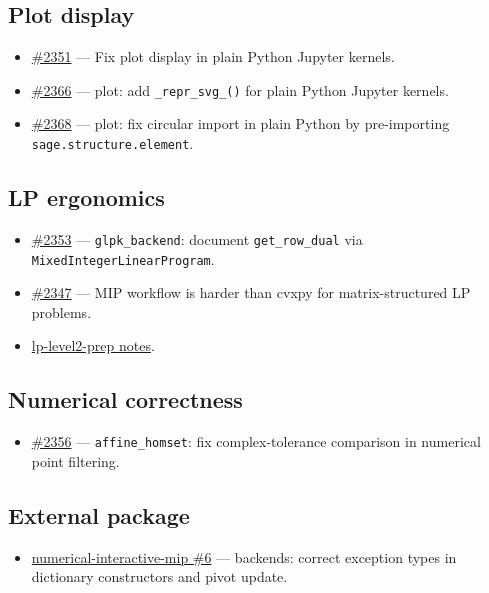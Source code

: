 \documentclass[10pt]{article}
\begin{document}
\subsection*{Plot display}
\begin{itemize}
  \item \href{https://github.com/passagemath/passagemath/pull/2351}{\#2351} --- Fix plot display in plain Python Jupyter kernels.
  \item \href{https://github.com/passagemath/passagemath/pull/2366}{\#2366} --- plot: add \texttt{\_repr\_svg\_()} for plain Python Jupyter kernels.
  \item \href{https://github.com/passagemath/passagemath/pull/2368}{\#2368} --- plot: fix circular import in plain Python by pre-importing \texttt{sage.structure.element}.
\end{itemize}

\subsection*{LP ergonomics}
\begin{itemize}
  \item \href{https://github.com/passagemath/passagemath/pull/2353}{\#2353} --- \texttt{glpk\_backend}: document \texttt{get\_row\_dual} via \texttt{MixedIntegerLinearProgram}.
  \item \href{https://github.com/passagemath/passagemath/issues/2347}{\#2347} --- MIP workflow is harder than cvxpy for matrix-structured LP problems.
  \item \href{https://github.com/sacchen/passagemath-workspace/blob/main/projects/lp-level2-prep.md}{lp-level2-prep notes}.
\end{itemize}

\subsection*{Numerical correctness}
\begin{itemize}
  \item \href{https://github.com/passagemath/passagemath/pull/2356}{\#2356} --- \texttt{affine\_homset}: fix complex-tolerance comparison in numerical point filtering.
\end{itemize}

\subsection*{External package}
\begin{itemize}
  \item \href{https://github.com/passagemath/passagemath-pkg-numerical-interactive-mip/pull/6}{numerical-interactive-mip \#6} --- backends: correct exception types in dictionary constructors and pivot update.
\end{itemize}
\end{document}
